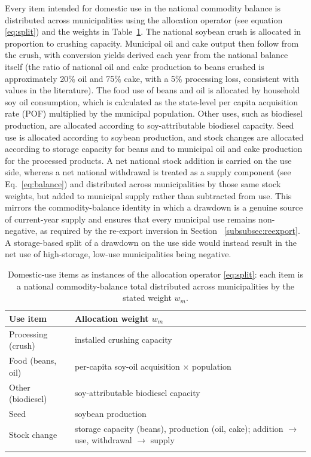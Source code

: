 Every item intended for domestic use in the national commodity balance is distributed across municipalities using the allocation operator (see equation \eqref{eq:split}) and the weights in Table~\ref{tab:weights}. The national soybean crush is allocated in proportion to crushing capacity. Municipal oil and cake output then follow from the crush, with conversion yields derived each year from the national balance itself (the ratio of national oil and cake production to beans crushed is approximately 20\% oil and 75\% cake, with a 5\% processing loss, consistent with values in the literature). The food use of beans and oil is allocated by household soy oil consumption, which is calculated as the state-level per capita acquisition rate (POF) multiplied by the municipal population. Other uses, such as biodiesel production, are allocated according to soy-attributable biodiesel capacity. Seed use is allocated according to soybean production, and stock changes are allocated according to storage capacity for beans and to municipal oil and cake production for the processed products. A net national stock addition is carried on the use side, whereas a net national withdrawal is treated as a supply component (see Eq.~\ref{eq:balance}) and distributed across municipalities by those same stock weights, but added to municipal supply rather than subtracted from use. This mirrors the commodity-balance identity in which a drawdown is a genuine source of current-year supply and ensures that every municipal use remains non-negative, as required by the re-export inversion in Section ~\ref{subsubsec:reexport}. A storage-based split of a drawdown on the use side would instead result in the net use of high-storage, low-use municipalities being negative.

\begin{table}[htbp]
\small
\caption{Domestic-use items as instances of the allocation operator
\eqref{eq:split}: each item is a national commodity-balance total distributed
across municipalities by the stated weight $w_m$.}\label{tab:weights}
\begin{tabular}{@{}ll@{}}
\toprule
Use item & Allocation weight $w_m$ \\
\midrule
Processing (crush)  & installed crushing capacity \\
Food (beans, oil)   & per-capita soy-oil acquisition $\times$ population \\
Other (biodiesel)   & soy-attributable biodiesel capacity \\
Seed                & soybean production \\
Stock change        & storage capacity (beans), production (oil, cake); addition $\to$ use, withdrawal $\to$ supply \\
\botrule
\end{tabular}
\end{table}

